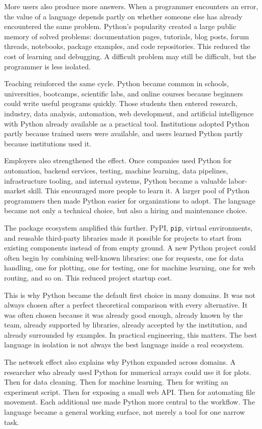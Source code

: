 More users also produce more answers. When a programmer encounters an error, the value of a language depends partly on whether someone else has already encountered the same problem. Python's popularity created a large public memory of solved problems: documentation pages, tutorials, blog posts, forum threads, notebooks, package examples, and code repositories. This reduced the cost of learning and debugging. A difficult problem may still be difficult, but the programmer is less isolated.

Teaching reinforced the same cycle. Python became common in schools, universities, bootcamps, scientific labs, and online courses because beginners could write useful programs quickly. Those students then entered research, industry, data analysis, automation, web development, and artificial intelligence with Python already available as a practical tool. Institutions adopted Python partly because trained users were available, and users learned Python partly because institutions used it.

Employers also strengthened the effect. Once companies used Python for automation, backend services, testing, machine learning, data pipelines, infrastructure tooling, and internal systems, Python became a valuable labor-market skill. This encouraged more people to learn it. A larger pool of Python programmers then made Python easier for organizations to adopt. The language became not only a technical choice, but also a hiring and maintenance choice.

The package ecosystem amplified this further. PyPI, \texttt{pip}, virtual environments, and reusable third-party libraries made it possible for projects to start from existing components instead of from empty ground. A new Python project could often begin by combining well-known libraries: one for requests, one for data handling, one for plotting, one for testing, one for machine learning, one for web routing, and so on. This reduced project startup cost.

This is why Python became the default first choice in many domains. It was not always chosen after a perfect theoretical comparison with every alternative. It was often chosen because it was already good enough, already known by the team, already supported by libraries, already accepted by the institution, and already surrounded by examples. In practical engineering, this matters. The best language in isolation is not always the best language inside a real ecosystem.

The network effect also explains why Python expanded across domains. A researcher who already used Python for numerical arrays could use it for plots. Then for data cleaning. Then for machine learning. Then for writing an experiment script. Then for exposing a small web API. Then for automating file movement. Each additional use made Python more central to the workflow. The language became a general working surface, not merely a tool for one narrow task.

